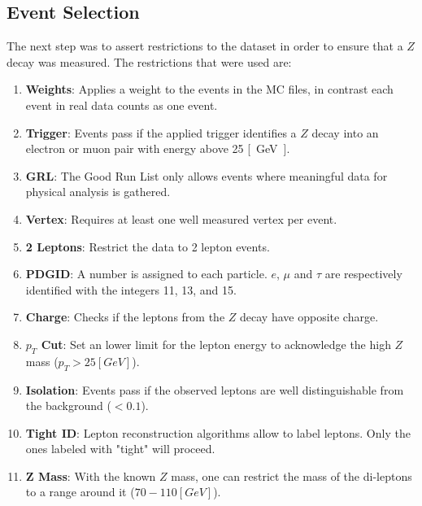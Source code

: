 \documentclass[12pt, a4paper, bibliography=totoc]{scrartcl}
\begin{document}
\begin{multicols}{2}
\subsection{Event Selection} 
The next step was to assert restrictions to the dataset in order to ensure that a $Z$ decay was measured.
The restrictions that were used are:
\begin{enumerate}
    \item \textbf{Weights}: Applies a weight to the events in the MC files, in contrast each event in real data counts as one event.
    \item \textbf{Trigger}: Events pass if the applied trigger identifies a $Z$ decay into an electron or muon pair with energy above 25 \si{[GeV]}.
    \item \textbf{GRL}: The Good Run List only allows events where meaningful data for physical analysis is gathered.
    \item \textbf{Vertex}: Requires at least one well measured vertex per event.
    \item \textbf{2 Leptons}: Restrict the data to 2 lepton events.
    \item \textbf{PDGID}: A number is assigned to each particle. $e$, $\mu$ and $\tau$ are respectively identified with the integers 11, 13, and 15.
    \item \textbf{Charge}: Checks if the leptons from the $Z$ decay have opposite charge.
    \item \textbf{$p_{T}$ Cut}: Set an lower limit for the lepton energy to acknowledge the high $Z$ mass ($p_{T} > 25 \si{[GeV]}$).
    \item \textbf{Isolation}: Events pass if the observed leptons are well distinguishable from the background ($< 0.1$).
    \item \textbf{Tight ID}: Lepton reconstruction algorithms allow to label leptons. Only the ones labeled with "tight" will proceed.
    \item \textbf{Z Mass}: With the known $Z$ mass, one can restrict the mass of the di-leptons to a range around it ($70 - 110 \si{[GeV]}$). 
\end{enumerate}


\end{multicols}
\end{document}
